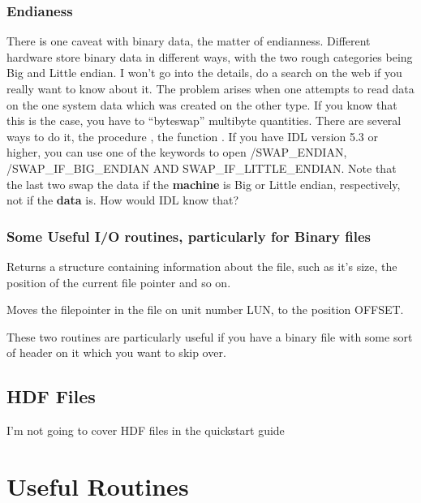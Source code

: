   \subsubsection{Endianess}

     There is one caveat with binary data, the matter of
     endianness. Different hardware store binary data in different
     ways, with the two rough categories being Big and Little endian.
     I won't go into the details, do a search on the web if you really
     want to know about it. The problem arises when one attempts to
     read data on the one system data which was created on the other
     type. If you know that this is the case, you have to ``byteswap''
     multibyte quantities. There are several ways to do it, the
     procedure , the function
     . If you have IDL version 5.3 or higher,
     you can use one of the keywords to open /SWAP\_ENDIAN,
     /SWAP\_IF\_BIG\_ENDIAN AND SWAP\_IF\_LITTLE\_ENDIAN. Note that
     the last two swap the data if the \textbf{machine} is Big or Little
     endian, respectively, not if the \textbf{data} is. How would IDL
     know  that?

  \subsubsection{Some Useful I/O routines, particularly for Binary files}
 
  
    Returns a structure containing information about the file, such as
    it's size, the position of the current file pointer and so on. 
  

    Moves the filepointer in the file on unit number LUN, to the
    position OFFSET.

    These two routines are particularly useful if you have a binary
    file with some sort of header on it which you want to skip over. 


\subsection{HDF Files}

  I'm not going to cover HDF files in the quickstart guide


\section{Useful Routines}\label{sec:qs-Useful-Routines}

